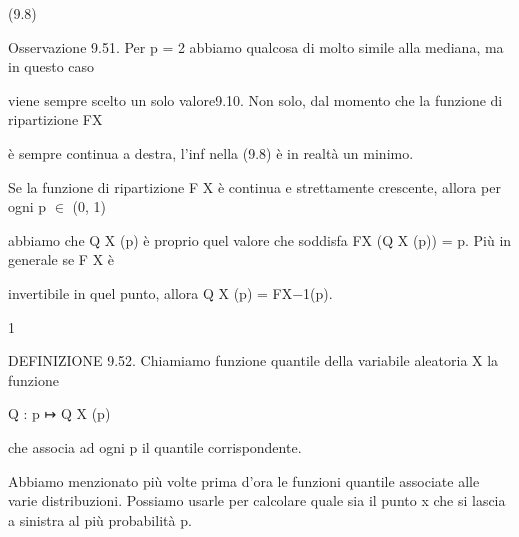 \documentclass[a4paper,portrait,12pt]{article}
\begin{document}
(9.8)





\begin{flushleft}
Osservazione 9.51. Per p = 2 abbiamo qualcosa di molto simile alla mediana, ma in questo caso
\end{flushleft}


\begin{flushleft}
viene sempre scelto un solo valore9.10. Non solo, dal momento che la funzione di ripartizione FX
\end{flushleft}


\begin{flushleft}
\`{e} sempre continua a destra, l'inf nella (9.8) \`{e} in realt\`{a} un minimo.
\end{flushleft}


\begin{flushleft}
Se la funzione di ripartizione F X \`{e} continua e strettamente crescente, allora per ogni p $\in$ (0, 1)
\end{flushleft}


\begin{flushleft}
abbiamo che Q X (p) \`{e} proprio quel valore che soddisfa FX (Q X (p)) = p. Più in generale se F X \`{e}
\end{flushleft}


\begin{flushleft}
invertibile in quel punto, allora Q X (p) = FX$-$1(p).
\end{flushleft}


1





\begin{flushleft}
DEFINIZIONE 9.52. Chiamiamo funzione quantile della variabile aleatoria X la funzione
\end{flushleft}


\begin{flushleft}
Q : p ↦ Q X (p)
\end{flushleft}


\begin{flushleft}
che associa ad ogni p il quantile corrispondente.
\end{flushleft}


\begin{flushleft}
Abbiamo menzionato più volte prima d'ora le funzioni quantile associate alle varie distribuzioni. Possiamo usarle per calcolare quale sia il punto x che si lascia a sinistra al più probabilit\`{a} p.
\end{flushleft}
\end{document}
